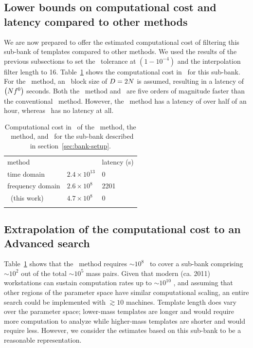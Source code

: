 \subsection{Lower bounds on computational cost and latency compared to other
methods}

We are now prepared to offer the estimated computational cost of filtering this
sub-bank of templates compared to other methods.  We used the results of the
previous subsections to set the \SVD\ tolerance at $\left(1-10^{-4}\right)$ and
the interpolation filter length to 16. Table~\ref{table:flops} shows the
computational cost in \flops\ for this sub-bank.  For the \FD\ method, an \fft\
block size of $D = 2 N$ is assumed, resulting in a latency of
$\left(N f^0\right)$ seconds.  Both the \FD\ method and \lloid\ are
five orders of magnitude faster than the conventional \TD\ method.  However,
the \FD\ method has a latency of over half of an hour, whereas \lloid\ has no
latency at all.
%
\begin{table}
\caption{\label{table:flops}Computational cost in \flops\ of the \TD\ method, the \FD\ method, and \lloid\ for the sub-bank described in section~\ref{sec:bank-setup}.}
\begin{center}
\begin{tabular}{lll}
\tableline\tableline
method & \flops\ & latency (s) \\
\tableline
time domain & $2.4\times10^{13}$ & 0 \\
frequency domain & $2.6\times10^8$ & 2201 \\
\lloid\ (this work) & $4.7\times10^8$ & 0 \\
\tableline
\end{tabular}
\end{center}
\end{table}

\subsection{Extrapolation of the computational cost to an Advanced \LIGO{} search}

Table~\ref{table:flops} shows that the \lloid\ method requires $\sim$$10^8$
\flops\ to cover a sub-bank comprising $\sim$$10^2$ out of the total $\sim$$10^5$
mass pairs.  Given that modern (ca. 2011) workstations can sustain computation
rates up to $\sim$$10^{10}$ \flops{}, and assuming that other regions of the
parameter space have similar computational scaling, an entire search could be
implemented with $\gtrsim$$10$ machines.  Template length does vary
over the parameter space; lower-mass templates are longer and would require
more computation to analyze while higher-mass templates are shorter and would
require less. However, we consider the estimates based on this sub-bank to be a
reasonable representation.

